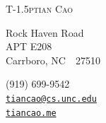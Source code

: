 \documentclass[line,margin]{res}
\begin{document}
\begin{adjustwidth}{-1.3in}{}
	{\Huge
		{\textsc{%
				{T}\kern-1.5ptian
				{C}ao}
		}
	}
	\hfill\hfill\hfill
	{
		\begin{minipage}[b]{2in}
			 Rock Haven Road \\ 
			APT E208 \\ 
			Carrboro, NC~~27510
		\end{minipage}
		\hfill
		\begin{minipage}[b]{1.8in}
			\flushright %
			(919) 699-9542 \, \faPhone \\ 
			\texttt{\href{mailto:tiancao@cs.unc.edu}{tiancao@cs.unc.edu}}\, \faEnvelope \\
			\texttt{\href{https://tiancao.me/}{tiancao.me}}\, \faGlobe 
		\end{minipage}
	}\par
\end{adjustwidth}  

\end{document}
